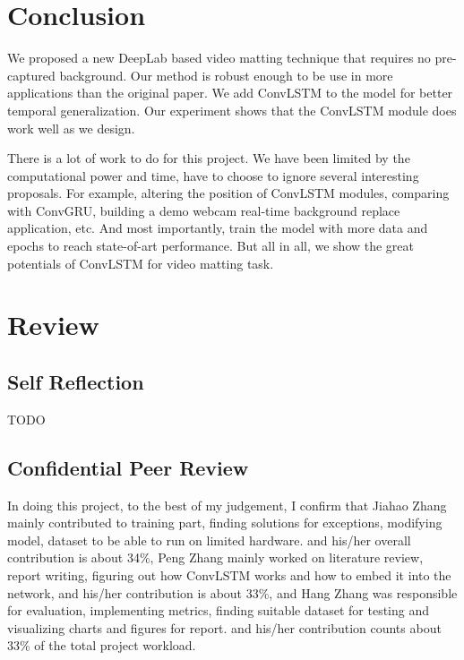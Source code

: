 \documentclass[final]{cvpr}
\begin{document}
\section{Conclusion}

We proposed a new DeepLab based video matting technique that requires no pre-captured background.
Our method is robust enough to be use in more applications than the original paper.
We add ConvLSTM to the model for better temporal generalization.
Our experiment shows that the ConvLSTM module does work well as we design.

There is a lot of work to do for this project.
We have been limited by the computational power and time, have to choose to ignore several interesting proposals.
For example, altering the position of ConvLSTM modules, comparing with ConvGRU, building a demo webcam real-time background replace application, etc.
And most importantly, train the model with more data and epochs to reach state-of-art performance.
But all in all, we show the great potentials of ConvLSTM for video matting task.




\section{Review}

\subsection{Self Reflection}

TODO

\subsection{Confidential Peer Review}

In doing this project, to the best of my judgement,
I confirm that Jiahao Zhang mainly contributed to training part, finding solutions for exceptions, modifying model, dataset to be able to run on limited hardware.
and his/her overall contribution is about 34\%,
Peng Zhang mainly worked on literature review, report writing, figuring out how ConvLSTM works and how to embed it into the network,
and his/her contribution is about 33\%,
and Hang Zhang was responsible for evaluation, implementing metrics, finding suitable dataset for testing and visualizing charts and figures for report.
and his/her contribution counts about 33\% of the total project workload.
\end{document}

